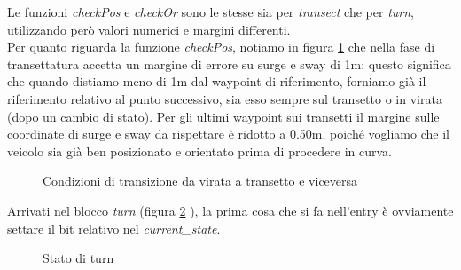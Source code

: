 \documentclass{article}
\begin{document}
            Le funzioni \emph{checkPos} e \emph{checkOr} sono le stesse sia per \emph{transect} che per \emph{turn}, utilizzando però valori numerici e margini differenti.\\
            Per quanto riguarda la funzione \emph{checkPos}, notiamo in figura \ref{fig:condit} che
            nella fase di transettatura accetta un margine di errore su surge e sway di 1m: questo significa che quando distiamo meno 
            di 1m dal waypoint di riferimento, forniamo già il riferimento relativo al punto successivo, sia esso sempre sul transetto o in virata (dopo un cambio di stato).
            Per gli ultimi waypoint sui transetti il margine sulle coordinate di surge e sway da rispettare è ridotto a 0.50m, poiché
            vogliamo che il veicolo sia già ben posizionato e orientato prima di procedere in curva. \\            

            \begin{figure} [ht]
                \caption{Condizioni di transizione da virata a transetto e viceversa}
                \label{fig:condit}
            \end{figure}



            Arrivati nel blocco \emph{turn} (figura \ref{fig:turn} ), la prima cosa che si fa nell'entry è ovviamente settare il bit relativo nel \emph{current\_state}. 

            \begin{figure} [ht]
                \caption{Stato di turn}
                \label{fig:turn}
            \end{figure}
\end{document}

